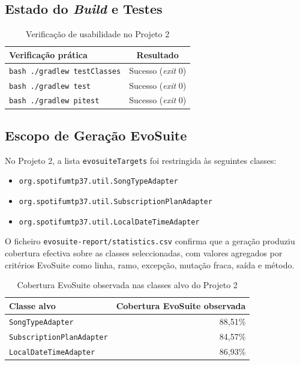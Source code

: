 \documentclass{article}
\begin{document}
\subsection{Estado do \emph{Build} e Testes}

\begin{table}[H]
\centering
\begin{tabular}{p{}c}
\toprule
Verificação prática & Resultado \\
\midrule
\texttt{bash ./gradlew testClasses} & Sucesso (\emph{exit} 0) \\
\texttt{bash ./gradlew test} & Sucesso (\emph{exit} 0) \\
\texttt{bash ./gradlew pitest} & Sucesso (\emph{exit} 0) \\
\bottomrule
\end{tabular}
\caption{Verificação de usabilidade no Projeto 2}
\end{table}

\subsection{Escopo de Geração EvoSuite}

No Projeto 2, a lista \texttt{evosuiteTargets} foi restringida às seguintes classes:
\begin{itemize}
    \item \texttt{org.spotifumtp37.util.SongTypeAdapter}
    \item \texttt{org.spotifumtp37.util.SubscriptionPlanAdapter}
    \item \texttt{org.spotifumtp37.util.LocalDateTimeAdapter}
\end{itemize}

O ficheiro \texttt{evosuite-report/statistics.csv} confirma que a geração produziu cobertura efectiva sobre as classes seleccionadas, com valores agregados por critérios EvoSuite como linha, ramo, excepção, mutação fraca, saída e método.

\begin{table}[H]
\centering
\begin{tabular}{lr}
\toprule
Classe alvo & Cobertura EvoSuite observada \\
\midrule
\texttt{SongTypeAdapter} & 88,51\% \\
\texttt{SubscriptionPlanAdapter} & 84,57\% \\
\texttt{LocalDateTimeAdapter} & 86,93\% \\
\bottomrule
\end{tabular}
\caption{Cobertura EvoSuite observada nas classes alvo do Projeto 2}
\end{table}
\end{document}
